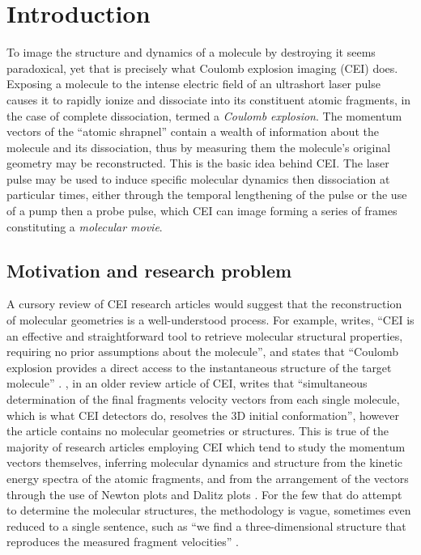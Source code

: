 \chapter{Introduction} \label{ch:introduction}


To image the structure and dynamics of a molecule by destroying it seems paradoxical, yet that is precisely what Coulomb explosion imaging (CEI) does. Exposing a molecule to the intense electric field of an ultrashort laser pulse causes it to rapidly ionize and dissociate into its constituent atomic fragments, in the case of complete dissociation, termed a \emph{Coulomb explosion}. The momentum vectors of the ``atomic shrapnel'' contain a wealth of information about the molecule and its dissociation, thus by measuring them the molecule's original geometry may be reconstructed. This is the basic idea behind CEI. The laser pulse may be used to induce specific molecular dynamics then dissociation at particular times, either through the temporal lengthening of the pulse or the use of a pump then a probe pulse, which CEI can image forming a series of frames constituting a \emph{molecular movie}.

\section*{Motivation and research problem}
A cursory review of CEI research articles would suggest that the reconstruction of molecular geometries is a well-understood process. For example, \citet{Xu16} writes, ``CEI is an effective and straightforward tool to retrieve molecular structural properties, requiring no prior assumptions about the molecule'', and \citet{Matsuda14} states that ``Coulomb explosion provides a direct access to the instantaneous structure of the target molecule'' \citep{Matsuda14}. \citet{Vager01}, in an older review article of CEI, writes that ``simultaneous determination of the final fragments velocity vectors from each single molecule, which is what CEI detectors do, resolves the 3D initial conformation'', however the article contains no molecular geometries or structures. This is true of the majority of research articles employing CEI which tend to study the momentum vectors themselves, inferring molecular dynamics and structure from the kinetic energy spectra of the atomic fragments, and from the arrangement of the vectors through the use of Newton plots and Dalitz plots \citep{Ramadhan16}. For the few that do attempt to determine the molecular structures, the methodology is vague, sometimes even reduced to a single sentence, such as ``we find a three-dimensional structure that reproduces the measured fragment velocities'' \citep{Legare05structure}.

